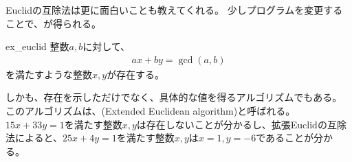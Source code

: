 
Euclidの互除法は更に面白いことも教えてくれる。
少しプログラムを変更することで、が得られる。

\begin{Theo}{}{ex_euclid}
整数$a,b$に対して、
\begin{align*}
ax + by = \gcd(a,b)
\end{align*}
を満たすような整数$x,y$が存在する。
\end{Theo}

しかも、存在を示しただけでなく、具体的な値を得るアルゴリズムでもある。
このアルゴリズムは、(Extended Euclidean algorithm)と呼ばれる。
$15x+33y=1$を満たす整数$x,y$は存在しないことが分かるし、拡張Euclidの互除法によると、$25x+4y=1$を満たす整数$x,y$は$x=1,y=-6$であることが分かる。

